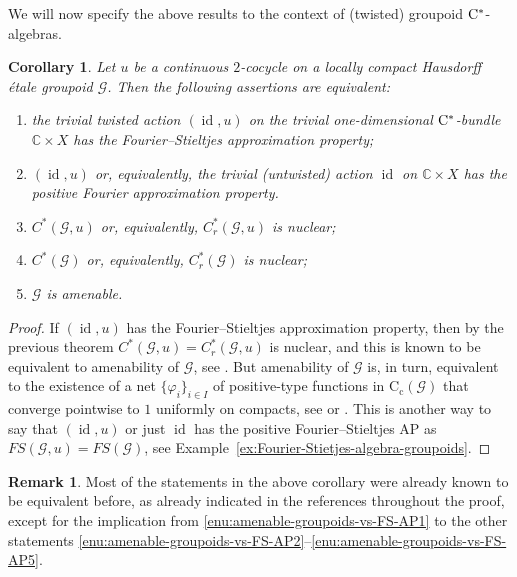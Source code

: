 \documentclass[11 pt, leqno]{amsart}
\numberwithin{equation}{section}
\theoremstyle{plain}
\newtheorem{cor}[thm]{Corollary}
\theoremstyle{definition}
\newtheorem {rem} [thm]{Remark}
\newtheorem{ex}[thm]{Example}
\newcommand*{\cstar}{\texorpdfstring{\(\Cst\)\nobreakdash-\hspace{0pt}}{*-}}
\newcommand*{\Cst}{\mathrm \cst}%
\newcommand*{\contc}{\mathrm{C_c}}%
\DeclareMathOperator{\id}{id}
\newcommand{\G}{\mathcal G} %
\newcommand{\C}{\mathbb C}
\newcommand{\cst}{\ifmmode\mathrm{C}^*\else{$\mathrm{C}^*$}\fi}
\begin{document}
We will now specify the above results to the context of (twisted) groupoid $\cst$-algebras.


\begin{cor}\label{cor:amenable-groupoids-vs-FS-AP}
Let $u$ be a continuous $2$-cocycle on a locally compact Hausdorff \'etale groupoid $\G$. 
Then the following assertions are equivalent:
\begin{enumerate}
    \item\label{enu:amenable-groupoids-vs-FS-AP1} the trivial twisted action $(\id,u)$ on the trivial one-dimensional \cstar{}bundle $\C\times X$ has the Fourier--Stieltjes approximation property;
    \item\label{enu:amenable-groupoids-vs-FS-AP2} $(\id,u)$ or, equivalently, the trivial (untwisted) action $\id$ on $\C\times X$ has the positive Fourier approximation property.
    \item\label{enu:amenable-groupoids-vs-FS-AP3} $C^*(\G,u)$ or, equivalently, $C^*_r(\G,u)$ is nuclear;
    \item\label{enu:amenable-groupoids-vs-FS-AP4} $C^*(\G)$ or, equivalently, $C^*_r(\G)$ is nuclear;
    \item\label{enu:amenable-groupoids-vs-FS-AP5}  $\G$ is amenable.
\end{enumerate}
\end{cor}
\begin{proof}
If $(\id,u)$ has the Fourier--Stieltjes approximation property, then by the previous theorem $C^*(\G,u)=C^*_r(\G,u)$ is nuclear, and this is known to be equivalent to amenability of $\G$, see \cite{Takeishi}. 
But amenability of $\G$ is, in turn, equivalent to the existence of a net $\{\varphi_i\}_{i\in I}$ of positive-type functions in $\contc(\G)$ that converge pointwise to $1$ uniformly on compacts, see \cite[Proposition~2.2.13]{AD-Renault-amenable} or \cite[Theorem~5.6.18]{BO}. 
This is another way to say that $(\id,u)$ or just $\id$ has the positive Fourier--Stieltjes AP as $FS(\G,u)=FS(\G)$, see Example~\ref{ex:Fourier-Stietjes-algebra-groupoids}.
\end{proof}

\begin{rem}
Most of the statements in the above corollary were already known to be equivalent before, as already indicated in the references throughout the proof, except for the implication from \ref{enu:amenable-groupoids-vs-FS-AP1} to the other statements \ref{enu:amenable-groupoids-vs-FS-AP2}--\ref{enu:amenable-groupoids-vs-FS-AP5}. 
\end{rem}
\end{document}
